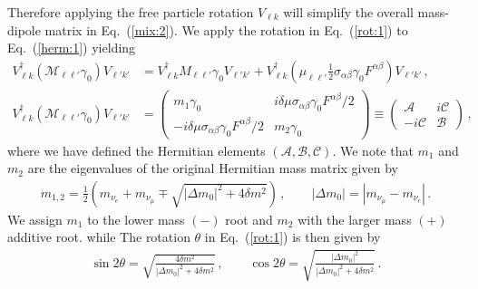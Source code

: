 \documentclass[addchapnum]{ws-rv961x669} %
\newcommand{\req}[1]{Eq.~(\ref{#1})}
\begin{document}
Therefore applying the free particle rotation $V_{\ell k}$ will simplify the overall mass-dipole matrix in \req{mix:2}. We apply the rotation in \req{rot:1} to \req{herm:1} yielding
\begin{align}
    \label{herm:2}
    V_{\ell k}^{\dag}(\mathcal{M}_{\ell\ell'}\gamma_{0})V_{\ell' k'} &= 
    V_{\ell k}^{\dag}M_{\ell\ell'}\gamma_{0}V_{\ell' k'} +
    V_{\ell k}^{\dag}(\mu_{\ell\ell'}\frac{1}{2}\sigma_{\alpha\beta}\gamma_{0}F^{\alpha\beta})V_{\ell' k'}\,,\\
    \label{herm:3}
    V_{\ell k}^{\dag}(\mathcal{M}_{\ell\ell'}\gamma_{0})V_{\ell' k'} &= 
	\begin{pmatrix}
        m_{1}\gamma_{0} & i\delta\mu\sigma_{\alpha\beta}\gamma_{0}F^{\alpha\beta}/2\\
        -i\delta\mu\sigma_{\alpha\beta}\gamma_{0}F^{\alpha\beta}/2 & m_{2}\gamma_{0}
	\end{pmatrix}\equiv
    \begin{pmatrix}
        \mathcal{A} & i\mathcal{C}\\
        -i\mathcal{C} & \mathcal{B}
    \end{pmatrix}\,,
\end{align}
where we have defined the Hermitian elements $(\mathcal{A},\mathcal{B},\mathcal{C})$. We note that $m_{1}$ and $m_{2}$ are the eigenvalues of the original Hermitian mass matrix given by
\begin{align}
    \label{massroot:1}
    m_{1,2}=\frac{1}{2}\left(m_{\nu_{e}}+m_{\nu_{\mu}}\mp\sqrt{|\Delta m_{0}|^{2}+4\delta m^{2}}\right)\,,\qquad
    |\Delta m_{0}|=|m_{\nu_{\mu}}-m_{\nu_{e}}|\,.
\end{align}
We assign $m_{1}$ to the lower mass $(-)$ root and $m_{2}$ with the larger mass $(+)$ additive root. while The rotation $\theta$ in \req{rot:1} is then given by
\begin{align}
    \label{massroot:2}
    \sin2\theta=\sqrt{\frac{4\delta m^{2}}{|\Delta m_{0}|^{2}+4\delta m^{2}}}\,,\qquad
    \cos2\theta=\sqrt{\frac{|\Delta m_{0}|^{2}}{|\Delta m_{0}|^{2}+4\delta m^{2}}}\,.
\end{align}
\end{document}
